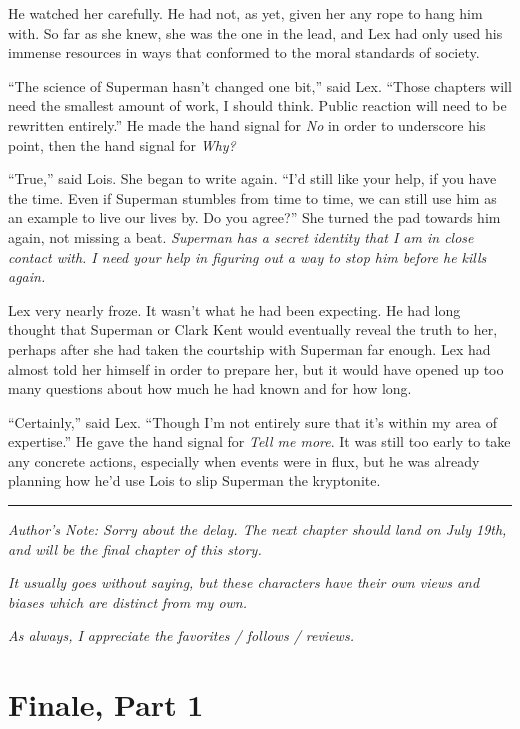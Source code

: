 \documentclass[ebook,12pt]{memoir}
\begin{document}
He watched her carefully. He had not, as yet, given her any rope to hang
him with. So far as she knew, she was the one in the lead, and Lex had
only used his immense resources in ways that conformed to the moral
standards of society.

``The science of Superman hasn't changed one bit,'' said Lex. ``Those
chapters will need the smallest amount of work, I should think. Public
reaction will need to be rewritten entirely.'' He made the hand signal
for \emph{No} in order to underscore his point, then the hand signal for
\emph{Why?}

``True,'' said Lois. She began to write again. ``I'd still like your
help, if you have the time. Even if Superman stumbles from time to time,
we can still use him as an example to live our lives by. Do you agree?''
She turned the pad towards him again, not missing a beat. \emph{Superman
has a secret identity that I am in close contact with. I need your help
in figuring out a way to stop him before he kills again.}

Lex very nearly froze. It wasn't what he had been expecting. He had long
thought that Superman or Clark Kent would eventually reveal the truth to
her, perhaps after she had taken the courtship with Superman far enough.
Lex had almost told her himself in order to prepare her, but it would
have opened up too many questions about how much he had known and for
how long.

``Certainly,'' said Lex. ``Though I'm not entirely sure that it's within
my area of expertise.'' He gave the hand signal for \emph{Tell me more}.
It was still too early to take any concrete actions, especially when
events were in flux, but he was already planning how he'd use Lois to
slip Superman the kryptonite.

\begin{center}\rule{0.5\linewidth}{\linethickness}\end{center}

\emph{Author's Note: Sorry about the delay. The next chapter should land
on July 19th, and will be the final chapter of this story.}

\emph{It usually goes without saying, but these characters have their
own views and biases which are distinct from my own.}

\emph{As always, I appreciate the favorites / follows / reviews.}
\chapter{Finale, Part 1}\label{finale-part-1}
\end{document}
